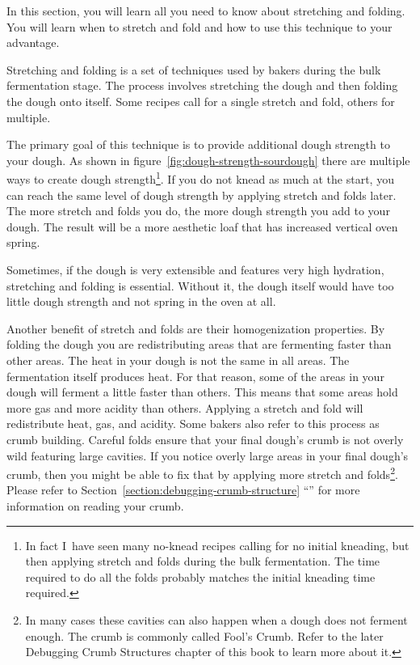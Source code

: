 In this section, you will learn all you need to know about stretching and
folding. You will learn when to stretch and fold and how to use this technique
to your advantage.

Stretching and folding is a set of techniques used by bakers during the bulk
fermentation stage. The process involves stretching the dough and then
folding the dough onto itself. Some recipes call for a single stretch
and fold, others for multiple.

The primary goal of this technique is to provide
additional dough strength to your dough. As shown in figure~\ref{fig:dough-strength-sourdough}
there are multiple ways to create dough strength\footnote{In fact I~have seen many no-knead
recipes calling for no initial kneading, but then applying stretch and folds
during the bulk fermentation. The time required to do all the folds probably
matches the initial kneading time required.}. If you do not knead as much at
the start, you can reach the same level of dough strength by applying stretch
and folds later. The more stretch and folds you do, the more dough strength
you add to your dough. The result will be a more aesthetic loaf that has
increased vertical oven spring.

Sometimes, if the dough is very extensible
and features very high hydration, stretching and folding is essential.
Without it, the dough itself would have too little dough strength and not
spring in the oven at all.

Another benefit of stretch and folds are their homogenization properties. By
folding the dough you are redistributing areas that are fermenting faster
than other areas. The heat in your dough is not the same in all areas.
The fermentation itself produces heat. For that reason, some of the areas in
your dough will ferment a little faster than others. This means that some
areas hold more gas and more acidity than others. Applying a stretch and fold
will redistribute heat, gas, and acidity. Some bakers also refer to this
process as crumb building. Careful folds ensure that your final dough's crumb
is not overly wild featuring large cavities. If you notice overly
large areas in your final dough's crumb, then you might be able to fix that
by applying more stretch and folds\footnote{In many cases these cavities can
also happen when a dough does not ferment enough. The crumb is commonly called
Fool's Crumb. Refer to the later Debugging Crumb Structures chapter of this
book to learn more about it.}. Please refer to Section~\ref{section:debugging-crumb-structure}
``'' for more information on reading
your crumb.


